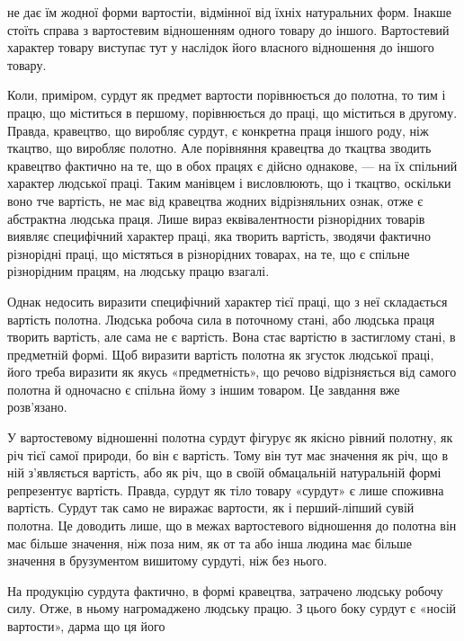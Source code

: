 не дає їм жодної форми вартостіи, відмінної від їхніх натуральних форм. Інакше стоїть справа з
вартостевим відношенням одного товару до іншого. Вартостевий характер товару виступає тут у наслідок
його власного відношення до іншого товару.

Коли, приміром, сурдут як предмет вартости порівнюється до полотна, то тим і працю, що міститься в
першому, порівнюється до праці, що міститься в другому. Правда, кравецтво, що виробляє сурдут, є
конкретна праця іншого роду, ніж ткацтво, що виробляє полотно. Але порівняння кравецтва до ткацтва
зводить кравецтво фактично на те, що в обох працях є дійсно однакове, — на їх спільний характер
людської праці. Таким манівцем і висловлюють, що і ткацтво, оскільки воно тче вартість, не має від
кравецтва жодних відрізняльних ознак, отже є абстрактна людська праця. Лише вираз еквівалентности
різнорідних товарів виявляє специфічний характер праці, яка творить вартість, зводячи фактично
різнорідні праці, що містяться в різнорідних товарах, на те, що є спільне різнорідним працям, на
людську працю взагалі.

Однак недосить виразити специфічний характер тієї праці, що з неї складається вартість полотна.
Людська робоча сила в поточному стані, або людська праця творить вартість, але сама не є вартість.
Вона стає вартістю в застиглому стані, в предметній формі. Щоб виразити вартість полотна як згусток
людської праці, його треба виразити як якусь «предметність», що речово відрізняється від самого
полотна й одночасно є спільна йому з іншим товаром. Це завдання вже розв’язано.

У вартостевому відношенні полотна сурдут фігурує як якісно рівний полотну, як річ тієї самої
природи, бо він є вартість. Тому він тут має значення як річ, що в ній з’являється вартість, або як
річ, що в своїй обмацальній натуральній формі репрезентує вартість. Правда, сурдут як тіло товару
«сурдут» є лише споживна вартість. Сурдут так само не виражає вартости, як і перший-ліпший сувій
полотна. Це доводить лише, що в межах вартостевого відношення до полотна він має більше значення,
ніж поза ним, як от та або інша людина має більше значення в брузументом вишитому сурдуті, ніж без
нього.

На продукцію сурдута фактично, в формі кравецтва, затрачено людську робочу силу. Отже, в ньому
нагромаджено людську працю. З цього боку сурдут є «носій вартости», дарма що ця його